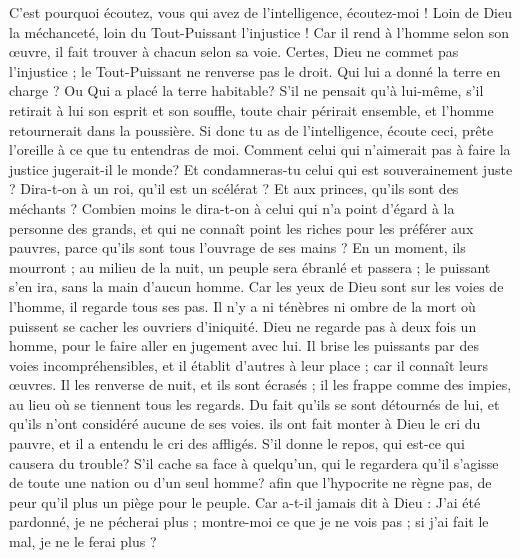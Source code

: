 \begin{multicols}{2}
{ C'est pourquoi écoutez, vous qui avez de l'intelligence, écoutez-moi ! Loin de Dieu la méchanceté, loin du Tout-Puissant l'injustice !
Car il rend à l'homme selon son œuvre, il fait trouver à chacun selon sa voie.
Certes, Dieu ne commet pas l'injustice ; le Tout-Puissant ne renverse pas le droit.
Qui lui a donné la terre en charge ? Ou Qui a placé la terre habitable?
S'il ne pensait qu'à lui-même, s'il retirait à lui son esprit et son souffle,
toute chair périrait ensemble, et l'homme retournerait dans la poussière.
Si donc tu as de l'intelligence, écoute ceci, prête l'oreille à ce que tu entendras de moi.
Comment celui qui n'aimerait pas à faire la justice jugerait-il le monde? Et condamneras-tu celui qui est souverainement juste ?
Dira-t-on à un roi, qu'il est un scélérat ? Et aux princes, qu'ils sont des méchants ?
Combien moins le dira-t-on à celui qui n'a point d'égard à la personne des grands, et qui ne connaît point les riches pour les préférer aux pauvres, parce qu'ils sont tous l'ouvrage de ses mains ?
En un moment, ils mourront ; au milieu de la nuit, un peuple sera ébranlé et passera ; le puissant s'en ira, sans la main d'aucun homme.
Car les yeux de Dieu sont sur les voies de l'homme, il regarde tous ses pas.
Il n'y a ni ténèbres ni ombre de la mort où puissent se cacher les ouvriers d'iniquité.
Dieu ne regarde pas à deux fois un homme, pour le faire aller en jugement avec lui.
Il brise les puissants par des voies incompréhensibles, et il établit d'autres à leur place ;
car il connaît leurs œuvres. Il les renverse de nuit, et ils sont écrasés ;
il les frappe comme des impies, au lieu où se tiennent tous les regards.
Du fait qu'ils se sont détournés de lui, et qu'ils n'ont considéré aucune de ses voies.
ils ont fait monter à Dieu le cri du pauvre, et il a entendu le cri des affligés.
S'il donne le repos, qui est-ce qui causera du trouble? S'il cache sa face à quelqu'un, qui le regardera qu'il s'agisse de toute une nation ou d'un seul homme?
afin que l'hypocrite ne règne pas, de peur qu'il plus un piège pour le peuple.
Car a-t-il jamais dit à Dieu : J'ai été pardonné, je ne pécherai plus ;
montre-moi ce que je ne vois pas ; si j'ai fait le mal, je ne le ferai plus ?
}
\end{multicols}
